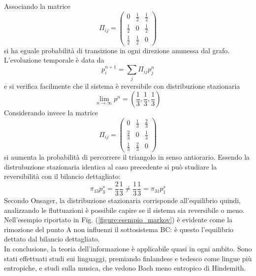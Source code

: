 \documentclass[12pt, a4paper]{book}
\theoremstyle{theorem}
\begin{document}
				Associando la matrice
				\begin{equation*}
					\Pi_{ij} = 
						\begin{pmatrix}
							0 & \frac{1}{2} & \frac{1}{2} \\
							\frac{1}{2} & 0 & \frac{1}{2} \\
							\frac{1}{2} & \frac{1}{2} & 0 
						\end{pmatrix}
				\end{equation*}
				si ha eguale probabilità di transizione in ogni direzione ammessa dal grafo.
				L'evoluzione temporale è data da
				\begin{equation*}
					p_i^{n+1}=\sum_j\Pi_{ij}p_j^n
				\end{equation*}
				e si verifica facilmente che il sistema è reversibile con distribuzione stazionaria
				\begin{equation*}
					\lim_{n\to\infty}p^n=\left(\frac{1}{3},\frac{1}{3},\frac{1}{3}\right)
				\end{equation*}
				Considerando invece la matrice
				\begin{equation*}
					\Pi_{ij} = 
						\begin{pmatrix}
							0 & \frac{1}{3} & \frac{2}{3} \\
							\frac{2}{3} & 0 & \frac{1}{3} \\
							\frac{1}{3} & \frac{2}{3} & 0 
						\end{pmatrix}
				\end{equation*}
				si aumenta la probabilità di percorrere il triangolo in senso antiorario.
				Essendo la distrubuzione stazionaria identica al caso precedente si può studiare la reversibilità con il bilancio dettagliato:
				\begin{equation*}
					\pi_{13}p_3^s = \frac{2}{3} \frac{1}{3} \neq \frac{1}{3}\frac{1}{3} = \pi_{31}p_1^s
				\end{equation*}
				Secondo Onsager, la distribuzione stazionaria corrisponde all'equilibrio quindi, analizzando le fluttuazioni è possibile capire se il sistema sia reversibile o meno.
				Nell'esempio riportato in Fig. (\ref{figure:esempio_markov}) è evidente come la rimozione del punto A non influenzi il sottosistema BC: è questo l'equilibrio dettato dal bilancio dettagliato.
				\\
				In conclusione, la teoria dell'informazione è applicabile quasi in ogni ambito.
				Sono stati effettuati studi sui linguaggi, premiando finlandese e tedesco come lingue più entropiche, e studi sulla musica, che vedono Bach meno entropico di Hindemith.
		
\end{document}
